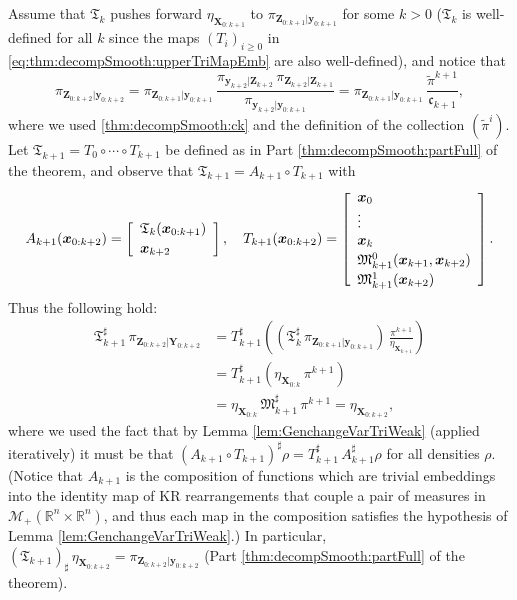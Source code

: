 \documentclass[twoside,11pt]{article}
\newcommand{\push}{_\sharp}                                      %
\newcommand{\borelm}{\mathscr{M}}
\newcommand{\borelmp}{\borelm_+}
\newcommand{\re}{\mathbb{R}}
\newcommand{\Xb}{\boldsymbol{X}}
\newcommand{\xb}{\boldsymbol{x}}
\newcommand{\Yb}{\boldsymbol{Y}}
\newcommand{\yb}{\boldsymbol{y}}
\newcommand{\Zb}{\boldsymbol{Z}}
\newcommand{\submap}{\mathfrak{M}}
\newcommand{\pull}{^\sharp}
\begin{document}
Assume that $\mathfrak{T}_k$ pushes forward $\eta_{\Xb_{0:k+1}}$ to 
$\pi_{\Zb_{0:k+1}\vert \yb_{0:k+1}}$ for
some $k>0$ ($\mathfrak{T}_k$ is well-defined for all
$k$ since the maps $(T_i)_{i \ge 0}$ in 
\eqref{eq:thm:decompSmooth:upperTriMapEmb}  are also well-defined),
and notice that
\begin{equation}
  \pi_{\Zb_{0:k+2}\vert \yb_{0:k+2}} = \pi_{\Zb_{0:k+1}\vert \yb_{0:k+1}} \,
  \frac{  \pi_{\yb_{k+2} \vert \Zb_{k+2} } \,
      \pi_{\Zb_{k+2}\vert\Zb_{k+1} } }
       {\pi_{\yb_{k+2}\vert \yb_{0:k+1}}} = 
  \pi_{\Zb_{0:k+1}\vert \yb_{0:k+1}} \,
  \frac{ \widetilde{\pi}^{k+1}  }{\mathfrak{c}_{k+1}},
\end{equation}
where we used \eqref{thm:decompSmooth:ck} and 
the definition of the collection $(\widetilde{\pi}^i)$.
Let $\mathfrak{T}_{k+1} = T_0 \circ \cdots \circ T_{k+1}$ be defined
as in Part \ref{thm:decompSmooth:partFull} of the theorem, and observe that
$\mathfrak{T}_{k+1} =
A_{k+1} \circ T_{k+1}$ with
%
\begin{equation}  
A_{k+1}( \xb_{0:k+2} ) = 
  \left[\begin{array}{l}
    \mathfrak{T}_k(\xb_{0:k+1})\\[\spacinglines] 
    \xb_{k+2}\\
     \end{array}\right], \quad
    T_{k+1}( \xb_{0:k+2} ) = \left[\begin{array}{l}
    \xb_0 \\ 
    \vdots \\
    \xb_{k} \\[\spacinglines]
    \submap_{k+1}^0( \xb_{k+1} , \xb_{k+2}) \\[\spacinglines]
    \submap_{k+1}^1( \xb_{k+2}) \\
    \end{array}\right].
\end{equation}
Thus the following hold:
\begin{align} \label{thm:decompSmooth:pullbacks}
 \mathfrak{T}_{k+1}\pull\,\pi_{\Zb_{0:k+2}\vert \Yb_{0:k+2}}  
 &= 
 T_{k+1}\pull \left( \left(\mathfrak{T}_{k}\pull\,\pi_{\Zb_{0:k+1}\vert \yb_{0:k+1}} \right) \,
 \frac{\pi^{k+1}}{\eta_{\Xb_{k+1}}}  \right) \\
 &=  
 T_{k+1}\pull \left( \eta_{\Xb_{0:k}} \, \pi^{k+1} \right) \nonumber \\
 &=  
 \eta_{\Xb_{0:k}} \,  \submap_{k+1}\pull \,\pi^{k+1}  =  \eta_{\Xb_{0:k+2}} , \nonumber
\end{align}
where we used the fact that
by Lemma \ref{lem:GenchangeVarTriWeak} 
(applied
iteratively)
it must be that 
$(A_{k+1} \circ T_{k+1})\pull \rho = T_{k+1} \pull \, A_{k+1} \pull \rho$
for all densities $\rho$.
%
(Notice that $A_{k+1}$ 
%
%
%
%
%
%
%
%
is the composition of functions which are trivial embeddings into
the identity map of KR rearrangements that couple a pair
of measures in $\borelmp(\re^n \times \re^n)$, %
and thus each map in the composition satisfies
the hypothesis of Lemma \ref{lem:GenchangeVarTriWeak}.)
In particular, 
$(\mathfrak{T}_{k+1})\push\, \eta_{\Xb_{0:k+2}} = \pi_{\Zb_{0:k+2}\vert \yb_{0:k+2}}$ 
(Part \ref{thm:decompSmooth:partFull} of the theorem).
%
\end{document}
